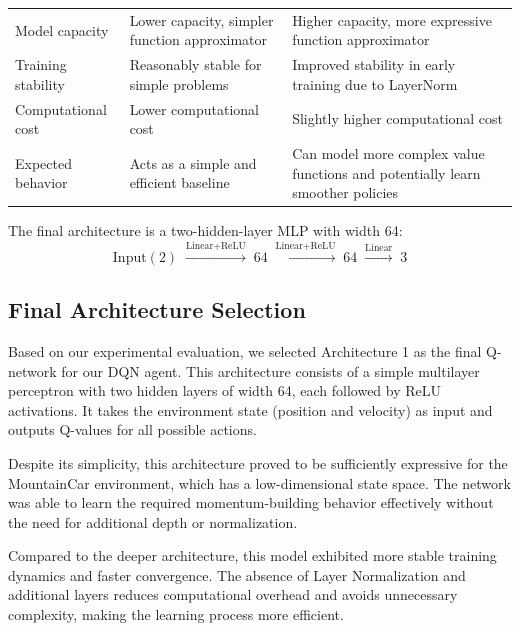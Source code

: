\documentclass[11pt,a4paper]{article}
\begin{document}
\begin{appendices}
\begin{table}[H]
\begin{tabular}{p{3.2cm} p{5.3cm} p{5.3cm}}
Model capacity &
Lower capacity, simpler function approximator &
Higher capacity, more expressive function approximator \\

Training stability &
Reasonably stable for simple problems &
Improved stability in early training due to LayerNorm \\

Computational cost &
Lower computational cost &
Slightly higher computational cost \\

Expected behavior &
Acts as a simple and efficient baseline &
Can model more complex value functions and potentially learn smoother policies \\

\bottomrule
\end{tabular}
\end{table}
The final architecture is a two-hidden-layer MLP with width 64:
\[
  \text{Input}(2)
  \;\xrightarrow{\text{Linear}+\text{ReLU}}\;
  64
  \;\xrightarrow{\text{Linear}+\text{ReLU}}\;
  64
  \;\xrightarrow{\text{Linear}}\;
  3
\]
\subsection{Final Architecture Selection}

Based on our experimental evaluation, we selected Architecture 1 as the final Q-network for our DQN agent. This architecture consists of a simple multilayer perceptron with two hidden layers of width 64, each followed by ReLU activations. It takes the environment state (position and velocity) as input and outputs Q-values for all possible actions.

Despite its simplicity, this architecture proved to be sufficiently expressive for the MountainCar environment, which has a low-dimensional state space. The network was able to learn the required momentum-building behavior effectively without the need for additional depth or normalization.

Compared to the deeper architecture, this model exhibited more stable training dynamics and faster convergence. The absence of Layer Normalization and additional layers reduces computational overhead and avoids unnecessary complexity, making the learning process more efficient.



\end{appendices}
\end{document}
